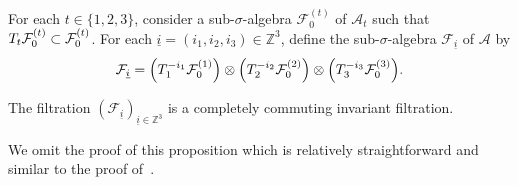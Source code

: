 \documentclass[AHL,Unicode,longabstracts,published]{cedram}
\newcommand{\Z}{\mathbb{Z}}
\newcommand{\Aca}{\mathcal{A}}
\newcommand{\Fca}{\mathcal{F}}
\newcommand{\pr}[1]{\left(#1\right)}
\let\originalleft\left
\let\originalright\right
\renewcommand{\left}{\mathopen{}\mathclose\bgroup\originalleft}
\renewcommand{\right}{\aftergroup\egroup\originalright}
\begin{document}
{For each $t\in\{1,2,3\}$, consider a sub-$\sigma$-algebra $\Fca_0^{(t)}$ of $\Aca_t$ such that $T_t\Fca_0^{\pr{t}}\subset \Fca_0^{\pr{t}}$. For each $\underline{i}=(i_1,i_2,i_3)\in\Z^3$, define the sub-$\sigma$-algebra $\Fca_{\underline{i}}$ of $\Aca$ by
\begin{equation}\label{filtration-produit}
\Fca_{\underline{i}}=\pr{T_1^{-i_1}\Fca_0^{\pr{1}}}\otimes
\pr{T_2^{-i_2}\Fca_0^{\pr{2}}}\otimes \pr{T_3^{-i_3}\Fca_0^{\pr{3}}}.
\end{equation}
}

\begin{prop}
The filtration {$(\Fca_{\underline{i}})_{\underline{i}\in\Z^3}$} is a completely commuting invariant filtration.
\end{prop}

We omit the proof of this proposition which is relatively straightforward and similar to the proof of~\cite[Proposition~1.2]{MR4754186}.
\end{document}
